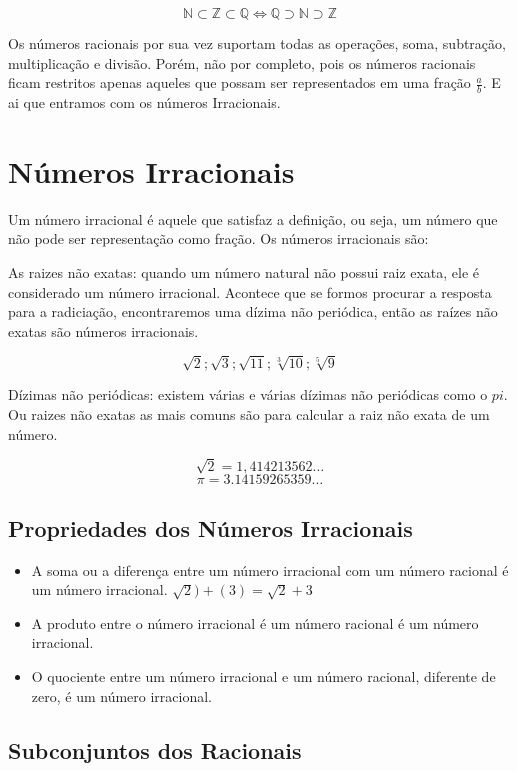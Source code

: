 \documentclass[letterpaper]{book}
\begin{document}
\[ \mathbb{N} \subset \mathbb{Z} \subset \mathbb{Q} \iff \mathbb{Q} \supset \mathbb{N} \supset \mathbb{Z} \]

Os números racionais por sua vez suportam todas as operações, soma, subtração, multiplicação e divisão. Porém, não por completo, pois os números racionais ficam restritos apenas aqueles que possam ser representados em uma fração \(\frac{a}{b}\). E ai que entramos com os números Irracionais.

\section{Números Irracionais}

Um número irracional é aquele que satisfaz a definição, ou seja, um número que não pode ser representação como fração. Os números irracionais são:


As raizes não exatas: quando um número natural não possui raiz exata, ele é considerado um número irracional. Acontece que se formos procurar a resposta para a radiciação, encontraremos uma dízima não periódica, então as raízes não exatas são números irracionais.

\[ \sqrt{2}; \sqrt{3}; \sqrt{11}; \sqrt[3]{10}; \sqrt[5]{9}\]

    Dízimas não periódicas: existem várias e várias dízimas não periódicas como o \(pi\). Ou raizes não exatas as mais comuns são para calcular a raiz não exata de um número.
    
\[\sqrt{2} = 1,414213562\ldots\]
\[\pi = 3.14159265359\ldots\]

\subsection{Propriedades dos Números Irracionais}

\begin{itemize}
\item A soma ou a diferença entre um número irracional com um número racional é um número irracional. \(\sqrt{2})+(3) = \sqrt{2} + 3\)
\item A produto entre o número irracional é um número racional é um número irracional.
\item O quociente entre um número irracional e um número racional, diferente de zero, é um número irracional.
\end{itemize}

\subsection{Subconjuntos dos Racionais}
\end{document}
